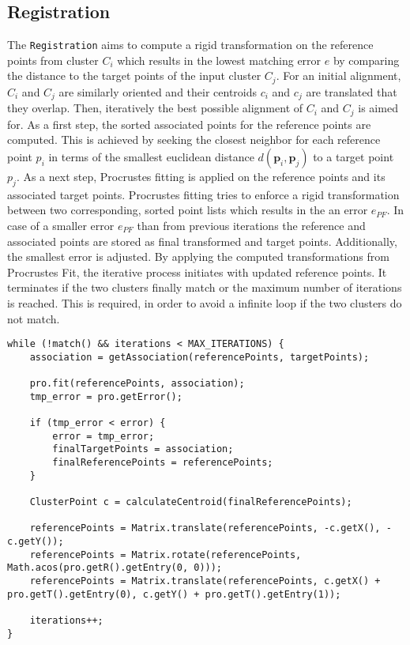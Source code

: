 \subsection{Registration}
\label{Registration}
The \texttt{Registration} aims to compute a rigid transformation on the reference points from cluster $C_i$ which results in the lowest matching error $e$ by comparing the distance to the target points of the input cluster $C_j$. For an initial alignment, $C_i$ and $C_j$ are similarly oriented and their centroids $c_i$ and $c_j$ are translated that they overlap. Then, iteratively the best possible alignment of $C_i$ and $C_j$ is aimed for. As a first step, the sorted associated points for the reference points are computed. This is achieved by seeking the closest neighbor for each reference point $p_i$ in terms of the smallest euclidean distance $d(\boldsymbol{p}_i,\boldsymbol{p}_j)$ to a target point $p_j$. As a next step, Procrustes fitting \cite{procrustesFitting} is applied on the reference points and its associated target points. Procrustes fitting tries to enforce a rigid transformation between two corresponding, sorted point lists which results in the an error $e_{PF}$. In case of a smaller error $e_{PF}$ than from previous iterations the reference and associated points are stored as final transformed and target points. Additionally, the smallest error is adjusted. By applying the computed transformations from Procrustes Fit, the iterative process initiates with updated reference points. It terminates if the two clusters finally match or the maximum number of iterations is reached. This is required, in order to avoid a infinite loop if the two clusters do not match.
\begin{lstlisting}
while (!match() && iterations < MAX_ITERATIONS) {
	association = getAssociation(referencePoints, targetPoints);
	
	pro.fit(referencePoints, association);
	tmp_error = pro.getError();
	
	if (tmp_error < error) {
		error = tmp_error;
		finalTargetPoints = association;
		finalReferencePoints = referencePoints;
	}
	
	ClusterPoint c = calculateCentroid(finalReferencePoints);
	
	referencePoints = Matrix.translate(referencePoints, -c.getX(), -c.getY());
	referencePoints = Matrix.rotate(referencePoints, Math.acos(pro.getR().getEntry(0, 0)));
	referencePoints = Matrix.translate(referencePoints, c.getX() + pro.getT().getEntry(0), c.getY() + pro.getT().getEntry(1));
	
	iterations++;
}
\end{lstlisting}

